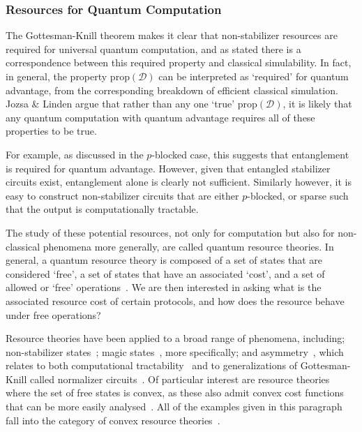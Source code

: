 \subsubsection{Resources for Quantum Computation}
The Gottesman-Knill theorem makes it clear that non-stabilizer resources are required for universal quantum computation, and as stated there is a correspondence between this required property and classical simulability. In fact, in general, the property $\text{prop}\left(\mathcal{D}\right)$ can be interpreted as `required' for quantum advantage, from the corresponding breakdown of efficient classical simulation. Jozsa \& Linden argue that rather than any one `true' $\text{prop}\left(\mathcal{D}\right)$, it is likely that any quantum computation with quantum advantage requires all of these properties to be true.\par
For example, as discussed in the $p$-blocked case, this suggests that entanglement is required for quantum advantage. However, given that entangled stabilizer circuits exist, entanglement alone is clearly not sufficient. Similarly however, it is easy to construct non-stabilizer circuits that are either $p$-blocked, or sparse such that the output is computationally tractable.\par
The study of these potential resources, not only for computation but also for non-classical phenomena more generally, are called quantum resource theories. In general, a quantum resource theory is composed of a set of states that are considered `free', a set of states that have an associated `cost', and a set of allowed or `free' operations~\cite{Brandao2015}. We are then interested in asking what is the associated resource cost of certain protocols, and how does the resource behave under free operations?\par
Resource theories have been applied to a broad range of phenomena, including; non-stabilizer states~\cite{Veitch2014}; magic states~\cite{Howard2017}, more specifically; and asymmetry~\cite{Piani2016}, which relates to both computational tractability~\cite{VandenNest2009} and to generalizations of Gottesman-Knill called normalizer circuits~\cite{BermejoVega2014}. Of particular interest are resource theories where the set of free states is convex, as these also admit convex cost functions that can be more easily analysed~\cite{Regula2018}. All of the examples given in this paragraph fall into the category of convex resource theories~\cite{Chitambar2019}.\par
